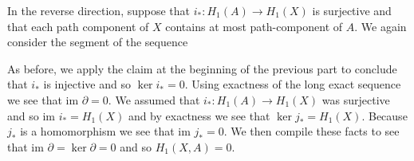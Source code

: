 \documentclass{article}
\newcommand{\im}{\text{im }}
\begin{document}
\begin{solution}{\parindent}
\begin{enumerate}
    In the reverse direction, suppose that $i_\ast: H_1(A) \to H_1(X)$
    is surjective and that each path component of $X$ contains at most
    path-component of $A$. We again consider the segment of the
    sequence
    \begin{center}
    \end{center}
    As before, we apply the claim at the beginning of the previous
    part to conclude that $i_\ast$ is injective and so $\ker i_\ast =
    0$. Using exactness of the long exact sequence we see that
    $\im \partial = 0$. We assumed that $i_\ast: H_1(A) \to H_1(X)$
    was surjective and so $\im i_\ast = H_1(X)$ and by exactness we
    see that $\ker j_\ast = H_1(X)$. Because $j_\ast$ is a
    homomorphism we see that $\im j_\ast = 0$. We then compile these
    facts to see that $\im \partial = \ker \partial = 0$ and so
    $H_1(X,A) = 0$.
  \end{enumerate}
\end{solution}
\end{document}
